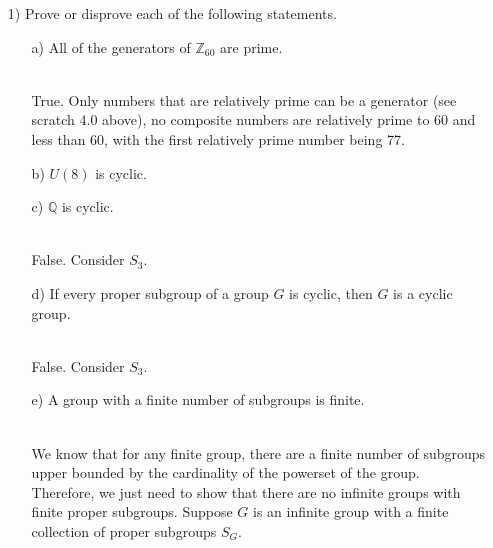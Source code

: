 \documentclass[11pt]{article}
\begin{document}
\begin{itemize}
    \item[1)] Prove or disprove each of the following statements.
    \begin{itemize}
        \item [a)]All of the generators of $\mathbb{Z}_{60}$ are prime.
        \begin{solution} \hfill \\
            True. Only numbers that are relatively prime can be a generator (see scratch 4.0 above), no composite numbers are relatively prime to 60 and less than 60, with the first relatively prime number being 77.
        \end{solution}
        \item [b)] $U(8)$ is cyclic.
        \item [c)]$\mathbb{Q}$ is cyclic.
        \begin{solution} \hfill \\
            False. Consider $S_3$.
        \end{solution}
        \item [d)]If every proper subgroup of a group $G$ is cyclic, then $G$ is a cyclic group.
        \begin{solution} \hfill \\
            False. Consider $S_3$.
        \end{solution}
        \item [e)]A group with a finite number of subgroups is finite.
        \begin{solution} \hfill \\
            We know that for any finite group, there are a finite number of subgroups upper bounded by the cardinality of the powerset of the group.\\
            Therefore, we just need to show that there are no infinite groups with finite proper subgroups. Suppose $G$ is an infinite group with a finite collection of proper subgroups $S_G$.
        \end{solution}


\end{itemize}
\end{itemize}
\end{document}
